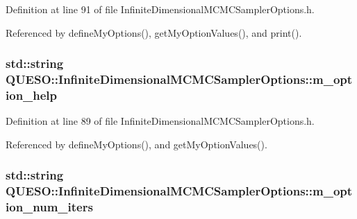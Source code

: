 Definition at line 91 of file Infinite\-Dimensional\-M\-C\-M\-C\-Sampler\-Options.\-h.



Referenced by define\-My\-Options(), get\-My\-Option\-Values(), and print().

\hypertarget{class_q_u_e_s_o_1_1_infinite_dimensional_m_c_m_c_sampler_options_a897fdd1438ecdd2cd9efe5b1abad55ba}{
\subsubsection[{m\-\_\-option\-\_\-help}]{\setlength{\rightskip}{0pt plus 5cm}std\-::string Q\-U\-E\-S\-O\-::\-Infinite\-Dimensional\-M\-C\-M\-C\-Sampler\-Options\-::m\-\_\-option\-\_\-help\hspace{0.3cm}{\ttfamily [private]}}}\label{class_q_u_e_s_o_1_1_infinite_dimensional_m_c_m_c_sampler_options_a897fdd1438ecdd2cd9efe5b1abad55ba}


Definition at line 89 of file Infinite\-Dimensional\-M\-C\-M\-C\-Sampler\-Options.\-h.



Referenced by define\-My\-Options(), and get\-My\-Option\-Values().

\hypertarget{class_q_u_e_s_o_1_1_infinite_dimensional_m_c_m_c_sampler_options_ab27e1a612339e516eb32b326e1dd6ed5}{
\subsubsection[{m\-\_\-option\-\_\-num\-\_\-iters}]{\setlength{\rightskip}{0pt plus 5cm}std\-::string Q\-U\-E\-S\-O\-::\-Infinite\-Dimensional\-M\-C\-M\-C\-Sampler\-Options\-::m\-\_\-option\-\_\-num\-\_\-iters\hspace{0.3cm}{\ttfamily [private]}}}\label{class_q_u_e_s_o_1_1_infinite_dimensional_m_c_m_c_sampler_options_ab27e1a612339e516eb32b326e1dd6ed5}


